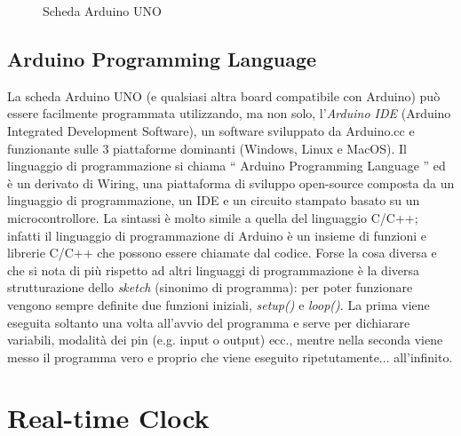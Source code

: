 \documentclass[12pt]{report}
\begin{document}
\begin{figure}[H]
	\caption{Scheda Arduino UNO}
	\label{fig:uno}
\end{figure}

%
\subsection{Arduino Programming Language}
%

La scheda Arduino UNO (e qualsiasi altra board compatibile con Arduino) può essere facilmente programmata utilizzando, ma non solo, l'\emph{Arduino IDE} (Arduino Integrated Development Software), un software sviluppato da Arduino.cc e funzionante sulle 3 piattaforme dominanti (Windows, Linux e MacOS). Il linguaggio di programmazione si chiama \textquotedblleft{} Arduino Programming Language \textquotedblright{}\cite{sistemi_embedded_atrent} ed è un derivato di Wiring, una piattaforma di sviluppo open-source composta da un linguaggio di programmazione, un IDE e un circuito stampato basato su un microcontrollore. La sintassi è molto simile a quella del linguaggio C/C++; infatti il linguaggio di programmazione di Arduino è un insieme di funzioni e librerie C/C++ che possono essere chiamate dal codice. Forse la cosa diversa e che si nota di più rispetto ad altri linguaggi di programmazione è la diversa strutturazione dello \emph{sketch} (sinonimo di programma): per poter funzionare vengono sempre definite due funzioni iniziali, \emph{setup()} e \emph{loop()}. La prima viene eseguita soltanto una volta all'avvio del programma e serve per dichiarare variabili, modalità dei pin (e.g. input o output) ecc., mentre nella seconda viene messo il programma vero e proprio che viene eseguito ripetutamente... all'infinito.


%
\section{Real-time Clock}
%
\end{document}
